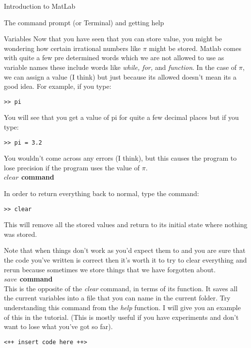 \documentclass[11pt, oneside]{report}   	%
\begin{document}
\begin{chapter}{Introduction to MatLab}
\begin{section}{The command prompt (or Terminal) and getting help}
\begin{subsection}{Variables}
Now that you have seen that you can store value, you might be wondering how certain irrational numbers like $\pi$ might be stored. Matlab comes with quite a few pre determined words which we are not allowed to use as variable names these include words like \textit{while, for,} and \textit{function}. In the case of $\pi$, we can assign a value (I think) but just because its allowed doesn't mean its a good idea. For example, if you type:

\begin{lstlisting}
>> pi
\end{lstlisting}

You will see that you get a value of pi for quite a few decimal places but if you type:

\begin{lstlisting}
>> pi = 3.2
\end{lstlisting}
You wouldn't come across any errors (I think), but this causes the program to lose precision if the program uses the value of $\pi$. 
\\

\textbf{$clear$ command}

In order to return everything back to normal, type the command:

\begin{lstlisting}
>> clear
\end{lstlisting}

This will remove all the stored values and return to its initial state where nothing was stored. 

Note that when things don't work as you'd expect them to and you are sure that the code you've written is correct then it's worth it to try to clear everything and rerun because
sometimes we store things that we have forgotten about.
\\

\textbf{$save$ command}
\\


This is the opposite of the \textit{clear} command, in terms of its function. It saves all the current variables into a file that you can name in the current folder. Try understanding
this command from the \textit{help} function. I will give you an example of this in the tutorial. (This is mostly useful if you have experiments and don't want to lose what you've
got so far).

\begin{lstlisting}
<++ insert code here ++>
\end{lstlisting}


\end{subsection}
\end{section}
\end{chapter}
\end{document}
